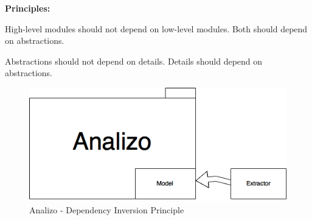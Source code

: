 \begin{Parallel}[v]{5cm}{5cm}
    \textbf{Principles:}
    \ParallelLText%
    {

        High-level modules should not depend on low-level modules. Both should depend on abstractions.
    }
    \ParallelRText%
    {

        Abstractions should not depend on details. Details should depend on abstractions.
    }
\end{Parallel}  

\begin{figure}[!htb]
    \centering
    \includegraphics[scale=0.5]{SOLID-D}
    \caption{Analizo - Dependency Inversion Principle}
\end{figure}

